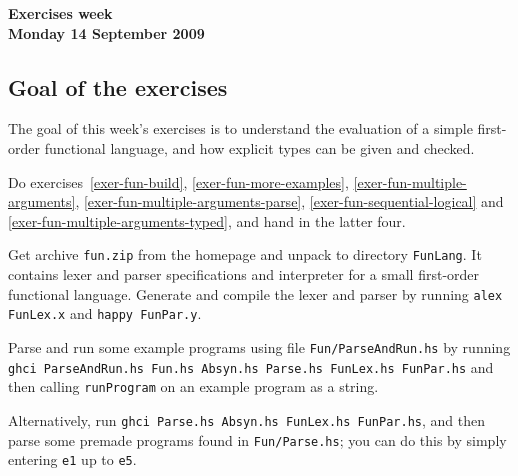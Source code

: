 \documentclass[a4paper]{article}
\begin{document}
\begin{center}
{\Large\bf Exercises week \\[1ex]
Monday 14 September 2009}\\[1ex]
\end{center}

\subsection*{Goal of the exercises}

The goal of this week's exercises is to understand the evaluation of a
simple first-order functional language, and how explicit types can be
given and checked.

Do exercises~\ref{exer-fun-build}, \ref{exer-fun-more-examples},
\ref{exer-fun-multiple-arguments},
\ref{exer-fun-multiple-arguments-parse},
\ref{exer-fun-sequential-logical} and
\ref{exer-fun-multiple-arguments-typed}, and hand in the latter four.

\begin{exercise}\label{exer-fun-build}
  Get archive \texttt{fun.zip} from the homepage and unpack to
  directory \texttt{FunLang}\@.  It contains lexer and parser
  specifications and interpreter for a small first-order functional
  language.  Generate and compile the lexer and parser by running
  \texttt{alex FunLex.x} and \texttt{happy FunPar.y}\@.
  
  Parse and run some example programs using
  file \texttt{Fun/ParseAndRun.hs} by running \texttt{ghci ParseAndRun.hs Fun.hs Absyn.hs Parse.hs FunLex.hs FunPar.hs} and then calling \texttt{runProgram} on an example program as a string.
  
  
  Alternatively, run \texttt{ghci Parse.hs Absyn.hs FunLex.hs FunPar.hs}, and then parse some premade programs found in \texttt{Fun/Parse.hs}; you can do this by simply entering \texttt{e1} up to \texttt{e5}.
\end{exercise}
\end{document}
